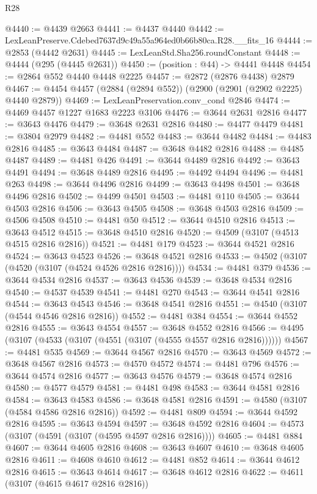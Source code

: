 \begin{lexlean}{R28}
\begin{coremodule}
@4440 := @4439 @2663
@4441 := @4437 @4440
@4442 := LexLeanPreserve.Cdebed7637d9c49a55a964ed0b66b80ca.R28.__fits_16
@4444 := @2853 (@4442 @2631)
@4445 := LexLeanStd.Sha256.roundConstant
@4448 := @4444 (@295 (@4445 @2631))
@4450 := (position : @44) -> @4441 @4448
@4454 := @2864 @552 @4440 @4448 @2225
@4457 := @2872 (@2876 @4438) @2879
@4467 := @4454 @4457 (@2884 (@2894 @552)) (@2900 (@2901 (@2902 @2225) @4440 @2879))
@4469 := LexLeanPreservation.conv_cond @2846
@4474 := @4469 @4457 @1227 @1683 @2223 @3106
@4476 := @3644 @2631 @2816
@4477 := @3643 @4476
@4479 := @3648 @2631 @2816
@4480 := @4477 @4479
@4481 := @3804 @2979
@4482 := @4481 @552
@4483 := @3644 @4482
@4484 := @4483 @2816
@4485 := @3643 @4484
@4487 := @3648 @4482 @2816
@4488 := @4485 @4487
@4489 := @4481 @426
@4491 := @3644 @4489 @2816
@4492 := @3643 @4491
@4494 := @3648 @4489 @2816
@4495 := @4492 @4494
@4496 := @4481 @263
@4498 := @3644 @4496 @2816
@4499 := @3643 @4498
@4501 := @3648 @4496 @2816
@4502 := @4499 @4501
@4503 := @4481 @110
@4505 := @3644 @4503 @2816
@4506 := @3643 @4505
@4508 := @3648 @4503 @2816
@4509 := @4506 @4508
@4510 := @4481 @50
@4512 := @3644 @4510 @2816
@4513 := @3643 @4512
@4515 := @3648 @4510 @2816
@4520 := @4509 (@3107 (@4513 @4515 @2816 @2816))
@4521 := @4481 @179
@4523 := @3644 @4521 @2816
@4524 := @3643 @4523
@4526 := @3648 @4521 @2816
@4533 := @4502 (@3107 (@4520 (@3107 (@4524 @4526 @2816 @2816))))
@4534 := @4481 @379
@4536 := @3644 @4534 @2816
@4537 := @3643 @4536
@4539 := @3648 @4534 @2816
@4540 := @4537 @4539
@4541 := @4481 @270
@4543 := @3644 @4541 @2816
@4544 := @3643 @4543
@4546 := @3648 @4541 @2816
@4551 := @4540 (@3107 (@4544 @4546 @2816 @2816))
@4552 := @4481 @384
@4554 := @3644 @4552 @2816
@4555 := @3643 @4554
@4557 := @3648 @4552 @2816
@4566 := @4495 (@3107 (@4533 (@3107 (@4551 (@3107 (@4555 @4557 @2816 @2816))))))
@4567 := @4481 @535
@4569 := @3644 @4567 @2816
@4570 := @3643 @4569
@4572 := @3648 @4567 @2816
@4573 := @4570 @4572
@4574 := @4481 @796
@4576 := @3644 @4574 @2816
@4577 := @3643 @4576
@4579 := @3648 @4574 @2816
@4580 := @4577 @4579
@4581 := @4481 @498
@4583 := @3644 @4581 @2816
@4584 := @3643 @4583
@4586 := @3648 @4581 @2816
@4591 := @4580 (@3107 (@4584 @4586 @2816 @2816))
@4592 := @4481 @809
@4594 := @3644 @4592 @2816
@4595 := @3643 @4594
@4597 := @3648 @4592 @2816
@4604 := @4573 (@3107 (@4591 (@3107 (@4595 @4597 @2816 @2816))))
@4605 := @4481 @884
@4607 := @3644 @4605 @2816
@4608 := @3643 @4607
@4610 := @3648 @4605 @2816
@4611 := @4608 @4610
@4612 := @4481 @852
@4614 := @3644 @4612 @2816
@4615 := @3643 @4614
@4617 := @3648 @4612 @2816
@4622 := @4611 (@3107 (@4615 @4617 @2816 @2816))

\end{coremodule}
\end{lexlean}
